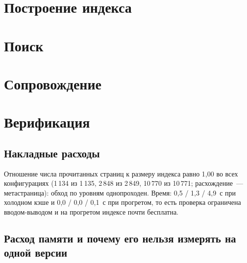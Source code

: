 \section{Построение индекса}


\section{Поиск}


\section{Сопровождение}


\section{Верификация}
\label{sec:eval-verify}

\subsection{Накладные расходы}

Отношение числа прочитанных страниц к размеру индекса равно 1,00 во всех
конфигурациях (1\,134 из 1\,135, 2\,848 из 2\,849, 10\,770 из 10\,771;
расхождение~--- метастраница): обход по уровням однопроходен. Время: 0,5 / 1,3 /
4,9~с при холодном кэше и 0,0 / 0,0 / 0,1~с при прогретом, то есть проверка
ограничена вводом-выводом и на прогретом индексе почти бесплатна.

\subsection{Расход памяти и почему его нельзя измерять на одной версии}


